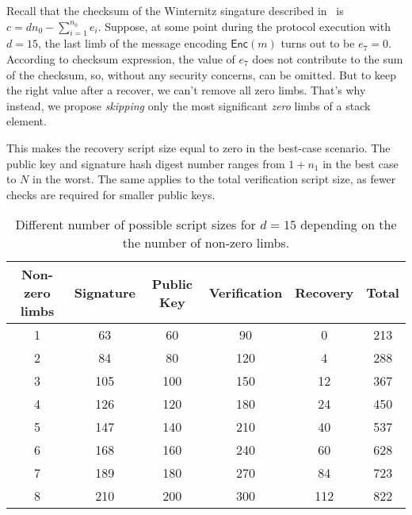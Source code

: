 \documentclass{iacrtrans}
\begin{document}
Recall that the checksum of the Winternitz singature described
in~\cite{applied-crypto} is $c = d n_0 - \sum_{i=1}^{n_0}e_i$. Suppose, at some
point during the protocol execution with $d=15$, the last limb of the message
encoding $\mathsf{Enc}(m)$ turns out to be $e_{7} = 0$. According to
checksum expression, the value of $e_{7}$ does not contribute to the
sum of the checksum, so, without any security concerns, can be omitted. But to
keep the right value after a recover, we can't remove all zero limbs. That's why
instead, we propose \textit{skipping} only the most significant \textit{zero}
limbs of a stack element.

This makes the recovery script size equal to zero in the best-case scenario. The public key and signature hash digest number ranges from $1 + n_1$ in the best case to $N$ in the worst. The same applies to the total verification script size, as fewer checks are required for smaller public keys.

\iffalse{}
\begin{verbatim}
import math
l = 32
d = 15
w = math.ceil(math.log(d+1, 2))
n0 = math.ceil(l / w)
n1 = math.ceil((2**w * n0).bit_length() / w)

for z in range(1, 8+1):
    k = z + n1
    
    pk_size = 20 * k
    ver_size = 2 * d * k
    sig_size = 21*k
    rec_size = 0
    for i in range(0, z):
        rec_size += int(i * w)
    
    total = pk_size + ver_size + rec_size + sig_size
    
    print(f"{z} & {sig_size} & {pk_size} & {ver_size} & {rec_size} & {total} \\\\")
\end{verbatim}
\fi
\begin{table}[H]
  \centering
  \begin{tabular}{cccccc}
    \toprule
    \textbf{Non-zero limbs} & \textbf{Signature} & \textbf{Public Key} & \textbf{Verification} & \textbf{Recovery} & \textbf{Total} \\
    \midrule
    1 & 63 & 60 & 90 & 0 & 213 \\
    2 & 84 & 80 & 120 & 4 & 288 \\
    3 & 105 & 100 & 150 & 12 & 367 \\
    4 & 126 & 120 & 180 & 24 & 450 \\
    5 & 147 & 140 & 210 & 40 & 537 \\
    6 & 168 & 160 & 240 & 60 & 628 \\
    7 & 189 & 180 & 270 & 84 & 723 \\
    8 & 210 & 200 & 300 & 112 & 822 \\
    \bottomrule
  \end{tabular}
  \caption{Different number of possible script sizes for $d = 15$
    depending on the the number of non-zero
    limbs.}\label{tab:winternitz-script-size}
\end{table}
\end{document}
